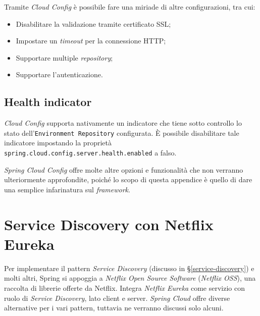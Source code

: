 Tramite \textit{Cloud Config} è possibile fare una miriade di altre configurazioni, tra cui:

\begin{itemize}
	\item Disabilitare la validazione tramite certificato SSL;
	\item Impostare un \textit{timeout} per la connessione HTTP;
	\item Supportare multiple \textit{repository};
	\item Supportare l'autenticazione.
\end{itemize}

\subsection{Health indicator} \textit{Cloud Config} supporta nativamente un indicatore che
tiene sotto controllo lo stato dell'\texttt{Environment Repository} configurata.
È possibile disabilitare tale indicatore impostando la proprietà \texttt{spring.cloud.config.server.health.enabled} a falso.

\bigskip

\textit{Spring Cloud Config} offre molte altre opzioni e funzionalità che non verranno ulteriormente approfondite, poiché lo scopo di questa appendice è quello di dare una semplice infarinatura sul \textit{framework}.


\section{Service Discovery con Netflix Eureka}

Per implementare il pattern \textit{Service Discovery} (discusso in \S\ref{service-discovery}) e molti altri, Spring si appoggia a \textit{Netflix Open Source Software} (\textit{Netflix OSS}), una raccolta di librerie offerte da Netflix.
Integra \textit{Netflix Eureka} come servizio con ruolo di \textit{Service Discovery}, lato client e server. \textit{Spring Cloud} offre diverse alternative per i vari pattern, tuttavia ne verranno discussi solo alcuni.

